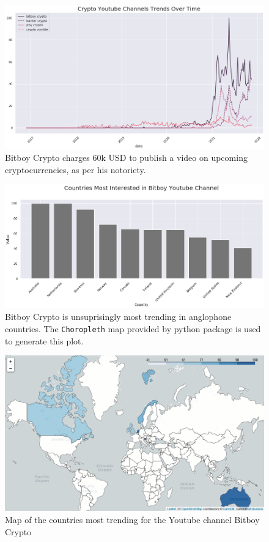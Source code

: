 \documentclass[twoside]{report}
\newcommand{\code}{\texttt}
\begin{document}
\begin{spacing}{1}
\begin{figure}[!htbp]
    \centering
    \includegraphics[scale = 0.5]{Images/youtube_channel_crypto_trends.png}
    \caption{Bitboy Crypto charges 60k USD to publish a video on upcoming cryptocurrencies, as per his notoriety.}
    \label{youtube_channel_crypto_trends}
\end{figure}

\begin{figure}[!htbp]
    \centering
    \includegraphics[scale = 0.5]{Images/countries_rank_bitboy_crypto_youtube.png}
    \caption{Bitboy Crypto is unsuprisingly most trending in anglophone countries. The \code{Choropleth} map provided by  python package is used to generate this plot.}
    \label{countries_rank_bitboy_crypto_youtube}
\end{figure}

\begin{figure}[!htbp]
    \centering
    \includegraphics[scale = 0.4]{Images/countries_map_2.png}
    \caption{Map of the countries most trending for the Youtube channel Bitboy Crypto}
    \label{countries_map_2}
\end{figure}



\end{spacing}
\end{document}
